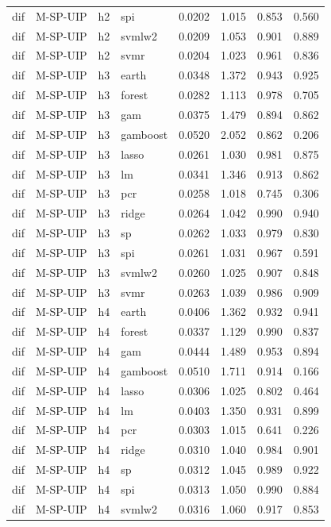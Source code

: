 \begin{ThreePartTable}
\begin{longtable}[t]{llclcccc}
dif & M-SP-UIP & h2 & spi & 0.0202 & 1.015 & 0.853 & 0.560\\
dif & M-SP-UIP & h2 & svmlw2 & 0.0209 & 1.053 & 0.901 & 0.889\\
dif & M-SP-UIP & h2 & svmr & 0.0204 & 1.023 & 0.961 & 0.836\\
\addlinespace
dif & M-SP-UIP & h3 & earth & 0.0348 & 1.372 & 0.943 & 0.925\\
dif & M-SP-UIP & h3 & forest & 0.0282 & 1.113 & 0.978 & 0.705\\
dif & M-SP-UIP & h3 & gam & 0.0375 & 1.479 & 0.894 & 0.862\\
dif & M-SP-UIP & h3 & gamboost & 0.0520 & 2.052 & 0.862 & 0.206\\
dif & M-SP-UIP & h3 & lasso & 0.0261 & 1.030 & 0.981 & 0.875\\
dif & M-SP-UIP & h3 & lm & 0.0341 & 1.346 & 0.913 & 0.862\\
dif & M-SP-UIP & h3 & pcr & 0.0258 & 1.018 & 0.745 & 0.306\\
dif & M-SP-UIP & h3 & ridge & 0.0264 & 1.042 & 0.990 & 0.940\\
dif & M-SP-UIP & h3 & sp & 0.0262 & 1.033 & 0.979 & 0.830\\
dif & M-SP-UIP & h3 & spi & 0.0261 & 1.031 & 0.967 & 0.591\\
dif & M-SP-UIP & h3 & svmlw2 & 0.0260 & 1.025 & 0.907 & 0.848\\
dif & M-SP-UIP & h3 & svmr & 0.0263 & 1.039 & 0.986 & 0.909\\
\addlinespace
dif & M-SP-UIP & h4 & earth & 0.0406 & 1.362 & 0.932 & 0.941\\
dif & M-SP-UIP & h4 & forest & 0.0337 & 1.129 & 0.990 & 0.837\\
dif & M-SP-UIP & h4 & gam & 0.0444 & 1.489 & 0.953 & 0.894\\
dif & M-SP-UIP & h4 & gamboost & 0.0510 & 1.711 & 0.914 & 0.166\\
dif & M-SP-UIP & h4 & lasso & 0.0306 & 1.025 & 0.802 & 0.464\\
dif & M-SP-UIP & h4 & lm & 0.0403 & 1.350 & 0.931 & 0.899\\
dif & M-SP-UIP & h4 & pcr & 0.0303 & 1.015 & 0.641 & 0.226\\
dif & M-SP-UIP & h4 & ridge & 0.0310 & 1.040 & 0.984 & 0.901\\
dif & M-SP-UIP & h4 & sp & 0.0312 & 1.045 & 0.989 & 0.922\\
dif & M-SP-UIP & h4 & spi & 0.0313 & 1.050 & 0.990 & 0.884\\
dif & M-SP-UIP & h4 & svmlw2 & 0.0316 & 1.060 & 0.917 & 0.853\\

\end{longtable}
\end{ThreePartTable}
